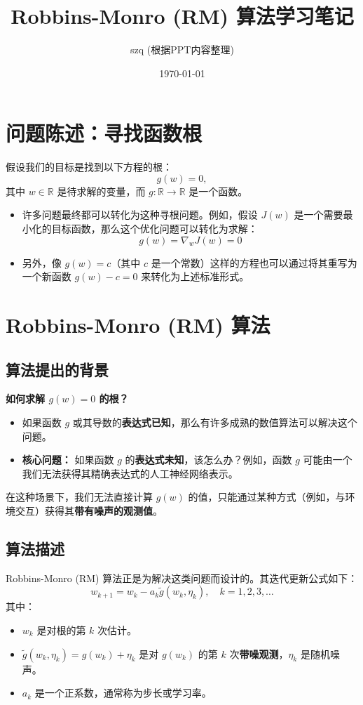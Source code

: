 \documentclass[12pt, a4paper]{article}
\title{\textbf{Robbins-Monro (RM) 算法学习笔记}}
\author{szq (根据PPT内容整理)}
\date{\today}
\begin{document}
\maketitle
\tableofcontents
\newpage

\section{问题陈述：寻找函数根}

假设我们的目标是找到以下方程的根：
\[
g(w) = 0,
\]
其中 $w \in \mathbb{R}$ 是待求解的变量，而 $g: \mathbb{R} \to \mathbb{R}$ 是一个函数。

\begin{itemize}
    \item 许多问题最终都可以转化为这种寻根问题。例如，假设 $J(w)$ 是一个需要最小化的目标函数，那么这个优化问题可以转化为求解：
    \[
    g(w) = \nabla_w J(w) = 0
    \]
    
    \item 另外，像 $g(w) = c$（其中 $c$ 是一个常数）这样的方程也可以通过将其重写为一个新函数 $g(w) - c = 0$ 来转化为上述标准形式。
\end{itemize}

\section{Robbins-Monro (RM) 算法}

\subsection{算法提出的背景}

\textbf{如何求解 $g(w) = 0$ 的根？}

\begin{itemize}
    \item 如果函数 $g$ 或其导数的\textbf{表达式已知}，那么有许多成熟的数值算法可以解决这个问题。
    
    \item \textbf{核心问题：} 如果函数 $g$ 的\textbf{表达式未知}，该怎么办？例如，函数 $g$ 可能由一个我们无法获得其精确表达式的人工神经网络表示。
\end{itemize}
在这种场景下，我们无法直接计算 $g(w)$ 的值，只能通过某种方式（例如，与环境交互）获得其\textbf{带有噪声的观测值}。

\subsection{算法描述}
Robbins-Monro (RM) 算法正是为解决这类问题而设计的。其迭代更新公式如下：
\[
w_{k+1} = w_k - a_k \tilde{g}(w_k, \eta_k), \quad k = 1, 2, 3, \dots
\]
其中：
\begin{itemize}
    \item $w_k$ 是对根的第 $k$ 次估计。
    \item $\tilde{g}(w_k, \eta_k) = g(w_k) + \eta_k$ 是对 $g(w_k)$ 的第 $k$ 次\textbf{带噪观测}，$\eta_k$ 是随机噪声。
    \item $a_k$ 是一个正系数，通常称为步长或学习率。
\end{itemize}
\end{document}
